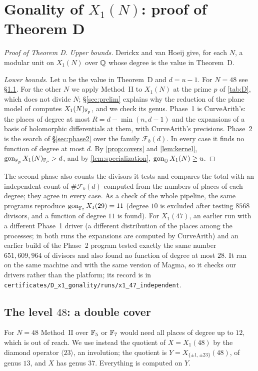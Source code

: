 \section{Gonality of \texorpdfstring{$X_1(N)$}{X1(N)}: proof of Theorem D}\label{sec:gonality-x1}

\begin{proof}[Proof of Theorem D]
\emph{Upper bounds.} Derickx and van Hoeij \cite[Table~1]{DerickxVanHoeij2014} give, for each $N$, a modular unit
on $X_1(N)$ over $\mathbb{Q}$ whose degree is the value in Theorem~D.

\emph{Lower bounds.} Let $u$ be the value in Theorem~D and $d=u-1$. For $N=48$ see \S\ref{sec:double-cover}. For the other $N$ we apply Method~II to $X_1(N)$ at the prime
$p$ of \cref{tab:D}, which does not divide $N$; \S\ref{sec:prelim} explains why the reduction of the plane model
of \cite{SutherlandX1} computes $X_1(N)_{\mathbb{F}_p}$, and we check its genus. Phase~1 is CurveArith's: the places of
degree at most $R=d-\min(n,d-1)$ and the expansions of a basis of holomorphic differentials at them, with
CurveArith's precisions. Phase~2 is the search of \S\ref{sec:phase2} over the family $\mathcal F_b(d)$. In every
case it finds no function of degree at most $d$. By \cref{prop:covers} and \cref{lem:kernel},
$\operatorname{gon}_{\mathbb{F}_p}X_1(N)_{\mathbb{F}_p}>d$, and by \cref{lem:specialization}, $\operatorname{gon}_{\mathbb{Q}} X_1(N)\ge u$.
\end{proof}



The second phase also counts the divisors it tests and compares the total with an independent count of
$\#\mathcal F_b(d)$ computed from the numbers of places of each degree; they agree in every case.
As a check of the whole pipeline, the same programs reproduce $\operatorname{gon}_{\mathbb{F}_2}X_1(29)=11$ (degree $10$ is
excluded after testing $8568$ divisors, and a function of degree $11$ is found). For $X_1(47)$, an earlier run
with a different Phase~1 driver (a different distribution of the places among the processes; in both runs the
expansions are computed by CurveArith) and an earlier build of the Phase~2 program tested
exactly the same number $651{,}609{,}964$ of divisors and also found no function of degree at most $28$. It ran on the
same machine and with the same version of Magma, so it checks our drivers rather than the platform; its
record is in \texttt{certificates/D\_x1\_gonality/runs/x1\_47\_independent}.

\subsection{The level \texorpdfstring{$48$}{48}: a double cover}\label{sec:double-cover}
For $N=48$ Method~II over $\mathbb{F}_5$ or $\mathbb{F}_7$ would need all places of degree up to $12$, which is out of reach.
We use instead the quotient of $X=X_1(48)$ by the diamond operator $\langle 23\rangle$, an involution; the
quotient is $Y=X_{\{\pm1,\pm23\}}(48)$, of genus $13$, and $X$ has genus $37$. Everything is computed on $Y$.

